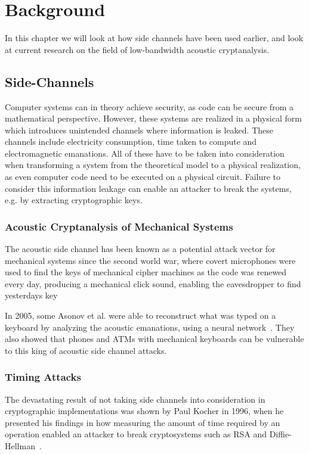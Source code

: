 \chapter{Background}\label{chp:background} 
In this chapter we will look at how side channels have been used earlier, and look at current research on the field of low-bandwidth acoustic cryptanalysis.


\section{Side-Channels}\label{chp2:sec:side_channel}
Computer systems can in theory achieve security, as code can be secure from a mathematical perspective.
However, these systems are realized in a physical form which introduces unintended channels where information is leaked.
These channels include electricity consumption, time taken to compute and electromagnetic emanations. 
All of these have to be taken into consideration when transforming a system from the theoretical model to a physical realization, as even computer code need to be executed on a physical circuit.
Failure to consider this information leakage can enable an attacker to break the systems, e.g. by extracting cryptographic keys.

\subsection{Acoustic Cryptanalysis of Mechanical Systems}\label{chp2:subsec:acoustic_cryptanalysis}
The acoustic side channel has been known as a potential attack vector for mechanical systems since the second world war, where covert microphones were used to find the keys of mechanical cipher machines as the code was renewed every day, producing a mechanical click sound, enabling the eavesdropper to find yesterdays key

In 2005, some Asonov et al. were able to reconstruct what was typed on a keyboard by analyzing the acoustic emanations, using a neural network~\cite{DBLP:conf/sp/AsonovA04}. 
They also showed that phones and ATMs with mechanical keyboards can be vulnerable to this king of acoustic side channel attacks.

\subsection{Timing Attacks}\label{chp2:subsec:timing_attacks}
The devastating result of not taking side channels into consideration in cryptographic implementations was shown by Paul Kocher in 1996, when he presented his findings in how measuring the amount of time required by an operation enabled an attacker to break cryptosystems such as RSA and Diffie-Hellman~\cite{DBLP:conf/crypto/Kocher96}.

